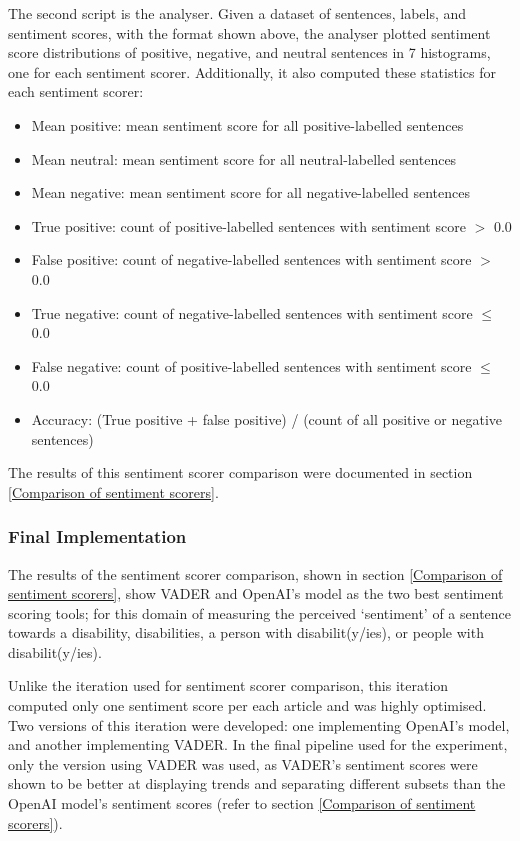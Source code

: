 \documentclass{report}
\begin{document}
The second script is the analyser.
Given a dataset of sentences, labels, and sentiment scores, with the format shown above, the analyser plotted sentiment score distributions of positive, negative, and neutral sentences in 7 histograms, one for each sentiment scorer.
Additionally, it also computed these statistics for each sentiment scorer:
\begin{itemize}
	\item Mean positive: mean sentiment score for all positive-labelled sentences
	\item Mean neutral: mean sentiment score for all neutral-labelled sentences
	\item Mean negative: mean sentiment score for all negative-labelled sentences
	\item True positive: count of positive-labelled sentences with sentiment score $>$ 0.0
	\item False positive: count of negative-labelled sentences with sentiment score $>$ 0.0 
	\item True negative: count of negative-labelled sentences with sentiment score $\le$ 0.0
	\item False negative: count of positive-labelled sentences with sentiment score $\le$ 0.0
	\item Accuracy: (True positive + false positive) / (count of all positive or negative sentences)
\end{itemize}
The results of this sentiment scorer comparison were documented in section \ref{Comparison of sentiment scorers}.

\subsubsection{Final Implementation} \label{des-sentiment-final}

The results of the sentiment scorer comparison, shown in section \ref{Comparison of sentiment scorers}, show VADER \cite{VADER} and OpenAI's model \cite{OpenAI} as the two best sentiment scoring tools; for this domain of measuring the perceived `sentiment' of a sentence towards a disability, disabilities, a person with disabilit(y/ies), or people with disabilit(y/ies).

Unlike the iteration used for sentiment scorer comparison, this iteration computed only one sentiment score per each article and was highly optimised.
Two versions of this iteration were developed: one implementing OpenAI's model, and another implementing VADER.
In the final pipeline used for the experiment, only the version using VADER was used, as VADER's sentiment scores were shown to be better at displaying trends and separating different subsets than the OpenAI model's sentiment scores (refer to section \ref{Comparison of sentiment scorers}).
\end{document}

